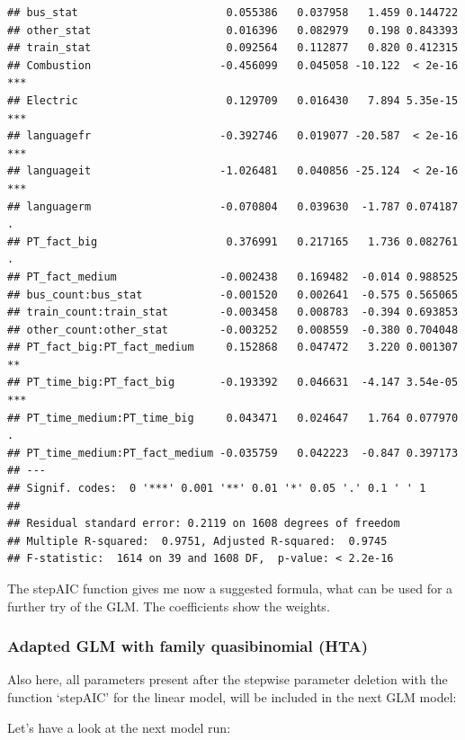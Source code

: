 \documentclass[
]{article}
\begin{document}
\begin{verbatim}
## bus_stat                       0.055386   0.037958   1.459 0.144722    
## other_stat                     0.016396   0.082979   0.198 0.843393    
## train_stat                     0.092564   0.112877   0.820 0.412315    
## Combustion                    -0.456099   0.045058 -10.122  < 2e-16 ***
## Electric                       0.129709   0.016430   7.894 5.35e-15 ***
## languagefr                    -0.392746   0.019077 -20.587  < 2e-16 ***
## languageit                    -1.026481   0.040856 -25.124  < 2e-16 ***
## languagerm                    -0.070804   0.039630  -1.787 0.074187 .  
## PT_fact_big                    0.376991   0.217165   1.736 0.082761 .  
## PT_fact_medium                -0.002438   0.169482  -0.014 0.988525    
## bus_count:bus_stat            -0.001520   0.002641  -0.575 0.565065    
## train_count:train_stat        -0.003458   0.008783  -0.394 0.693853    
## other_count:other_stat        -0.003252   0.008559  -0.380 0.704048    
## PT_fact_big:PT_fact_medium     0.152868   0.047472   3.220 0.001307 ** 
## PT_time_big:PT_fact_big       -0.193392   0.046631  -4.147 3.54e-05 ***
## PT_time_medium:PT_time_big     0.043471   0.024647   1.764 0.077970 .  
## PT_time_medium:PT_fact_medium -0.035759   0.042223  -0.847 0.397173    
## ---
## Signif. codes:  0 '***' 0.001 '**' 0.01 '*' 0.05 '.' 0.1 ' ' 1
## 
## Residual standard error: 0.2119 on 1608 degrees of freedom
## Multiple R-squared:  0.9751, Adjusted R-squared:  0.9745 
## F-statistic:  1614 on 39 and 1608 DF,  p-value: < 2.2e-16
\end{verbatim}

The stepAIC function gives me now a suggested formula, what can be used
for a further try of the GLM. The coefficients show the weights.

\hypertarget{adapted-glm-with-family-quasibinomial-hta}{%
\subsubsection{\texorpdfstring{Adapted GLM with family quasibinomial
(HTA)\newline}{Adapted GLM with family quasibinomial (HTA)}}\label{adapted-glm-with-family-quasibinomial-hta}}

Also here, all parameters present after the stepwise parameter deletion
with the function `stepAIC' for the linear model, will be included in
the next GLM model:

Let's have a look at the next model run:
\end{document}
